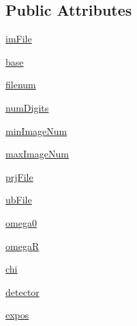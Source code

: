 \subsection*{Public Attributes}
\begin{DoxyCompactItemize}
\item 
\hyperlink{class_project_1_1_project_aec70e48d90635d6c41b66660fc23c14b}{im\-File}
\item 
\hyperlink{class_project_1_1_project_a4a1a26e41d50eafb9a1ecd7c344ae974}{base}
\item 
\hyperlink{class_project_1_1_project_ae8e5eb7ce2196fd5eec5b91686732069}{filenum}
\item 
\hyperlink{class_project_1_1_project_abf36ec5e3005385e03d533200b5c098a}{num\-Digits}
\item 
\hyperlink{class_project_1_1_project_af03d34654b00a3f4d1f8a38b834af406}{min\-Image\-Num}
\item 
\hyperlink{class_project_1_1_project_afc5b3afcc2020e4527c6328c508ad5c9}{max\-Image\-Num}
\item 
\hyperlink{class_project_1_1_project_aed74c6fd1832b33e1299f1180a691fa6}{prj\-File}
\item 
\hyperlink{class_project_1_1_project_a8eae8faddab323b07537ca6a5f3916cc}{ub\-File}
\item 
\hyperlink{class_project_1_1_project_ae2e3e43c456a03959ddc60f010e54aa9}{omega0}
\item 
\hyperlink{class_project_1_1_project_a05d50a418a51ea0f4dcf7d1a87812b00}{omega\-R}
\item 
\hyperlink{class_project_1_1_project_aae1d33efbce822c8023528ff7f3b841a}{chi}
\item 
\hyperlink{class_project_1_1_project_a2513615e3adc838e60e00da5c77ef307}{detector}
\item 
\hyperlink{class_project_1_1_project_aa53e83e0b9b4b05e86bbb6b80873d700}{expos}
\end{DoxyCompactItemize}
